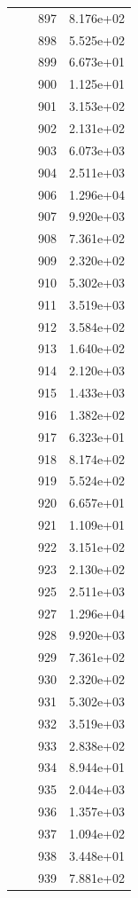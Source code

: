 \documentclass[12pt]{article}
\begin{document}
\begin{longtable}{@{}cccc@{}}
 &  & 897 & 8.176e+02 \\
 &  & 898 & 5.525e+02 \\
 &  & 899 & 6.673e+01 \\
 &  & 900 & 1.125e+01 \\
 &  & 901 & 3.153e+02 \\
 &  & 902 & 2.131e+02 \\
 &  & 903 & 6.073e+03 \\
 &  & 904 & 2.511e+03 \\
 &  & 906 & 1.296e+04 \\
 &  & 907 & 9.920e+03 \\
 &  & 908 & 7.361e+02 \\
 &  & 909 & 2.320e+02 \\
 &  & 910 & 5.302e+03 \\
 &  & 911 & 3.519e+03 \\
 &  & 912 & 3.584e+02 \\
 &  & 913 & 1.640e+02 \\
 &  & 914 & 2.120e+03 \\
 &  & 915 & 1.433e+03 \\
 &  & 916 & 1.382e+02 \\
 &  & 917 & 6.323e+01 \\
 &  & 918 & 8.174e+02 \\
 &  & 919 & 5.524e+02 \\
 &  & 920 & 6.657e+01 \\
 &  & 921 & 1.109e+01 \\
 &  & 922 & 3.151e+02 \\
 &  & 923 & 2.130e+02 \\
 &  & 925 & 2.511e+03 \\
 &  & 927 & 1.296e+04 \\
 &  & 928 & 9.920e+03 \\
 &  & 929 & 7.361e+02 \\
 &  & 930 & 2.320e+02 \\
 &  & 931 & 5.302e+03 \\
 &  & 932 & 3.519e+03 \\
 &  & 933 & 2.838e+02 \\
 &  & 934 & 8.944e+01 \\
 &  & 935 & 2.044e+03 \\
 &  & 936 & 1.357e+03 \\
 &  & 937 & 1.094e+02 \\
 &  & 938 & 3.448e+01 \\
 &  & 939 & 7.881e+02 \\

\end{longtable}
\end{document}
